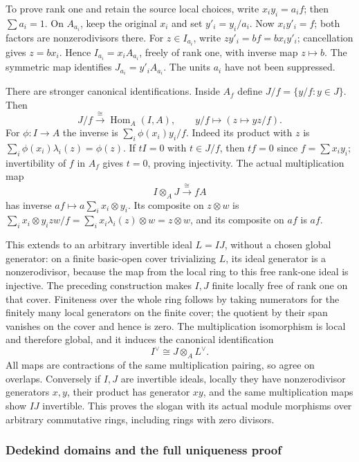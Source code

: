 To prove rank one and retain the source local choices, write \(x_i y_i=a_i f\); then \(\sum a_i=1\). On \(A_{a_i}\), keep the original \(x_i\) and set \(y'_i=y_i/a_i\). Now \(x_i y'_i=f\); both factors are nonzerodivisors there. For \(z\in I_{a_i}\), write \(z y'_i=b f=b x_i y'_i\); cancellation gives \(z=b x_i\). Hence \(I_{a_i}=x_i A_{a_i}\), freely of rank one, with inverse map \(z\mapsto b\). The symmetric map identifies \(J_{a_i}=y'_i A_{a_i}\). The units \(a_i\) have not been suppressed.

There are stronger canonical identifications. Inside \(A_f\) define \(J/f=\{y/f:y\in J\}\). Then \[
 J/f\xrightarrow{\;\cong\;}\operatorname{Hom}_A(I,A),
 \qquad y/f\longmapsto(z\mapsto yz/f).
\] For \(\phi:I\to A\) the inverse is \(\sum_i\phi(x_i)y_i/f\). Indeed its product with \(z\) is \(\sum_i\phi(x_i)\lambda_i(z)=\phi(z)\). If \(tI=0\) with \(t\in J/f\), then \(tf=0\) since \(f=\sum x_i y_i\); invertibility of \(f\) in \(A_f\) gives \(t=0\), proving injectivity. The actual multiplication map \[
 I\otimes_A J\xrightarrow{\;\cong\;}fA
\] has inverse \(af\mapsto a\sum_i x_i\otimes y_i\). Its composite on \(z\otimes w\) is \(\sum_i x_i\otimes y_i zw/f=\sum_i x_i\lambda_i(z)\otimes w=z\otimes w\), and its composite on \(af\) is \(af\).

This extends to an arbitrary invertible ideal \(L=IJ\), without a chosen global generator: on a finite basic-open cover trivializing \(L\), its ideal generator is a nonzerodivisor, because the map from the local ring to this free rank-one ideal is injective. The preceding construction makes \(I,J\) finite locally free of rank one on that cover. Finiteness over the whole ring follows by taking numerators for the finitely many local generators on the finite cover; the quotient by their span vanishes on the cover and hence is zero. The multiplication isomorphism is local and therefore global, and it induces the canonical identification \[
 I^\vee\cong J\otimes_A L^\vee.
\] All maps are contractions of the same multiplication pairing, so agree on overlaps. Conversely if \(I,J\) are invertible ideals, locally they have nonzerodivisor generators \(x,y\), their product has generator \(xy\), and the same multiplication maps show \(IJ\) invertible. This proves the slogan with its actual module morphisms over arbitrary commutative rings, including rings with zero divisors.

\subsubsection{Dedekind domains and the full uniqueness proof}\label{dedekind-domains-and-the-full-uniqueness-proof}

